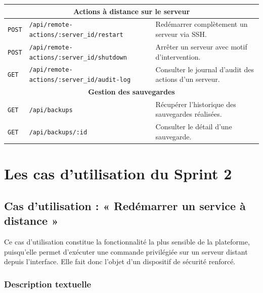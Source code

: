 \begin{longtable}{|p{1.6cm}|>{\raggedright\arraybackslash}p{7.4cm}|p{5.4cm}|}
\multicolumn{3}{|c|}{\textbf{Actions à distance sur le serveur}} \\
\hline
\texttt{POST} & \texttt{/api/remote-actions/}\allowbreak\texttt{:server\_id/}\allowbreak\texttt{restart} & Redémarrer complètement un serveur via SSH. \\
\hline
\texttt{POST} & \texttt{/api/remote-actions/}\allowbreak\texttt{:server\_id/}\allowbreak\texttt{shutdown} & Arrêter un serveur avec motif d'intervention. \\
\hline
\texttt{GET} & \texttt{/api/remote-actions/}\allowbreak\texttt{:server\_id/}\allowbreak\texttt{audit-log} & Consulter le journal d'audit des actions d'un serveur. \\
\hline

\multicolumn{3}{|c|}{\textbf{Gestion des sauvegardes}} \\
\hline
\texttt{GET} & \texttt{/api/backups} & Récupérer l'historique des sauvegardes réalisées. \\
\hline
\texttt{GET} & \texttt{/api/backups/:id} & Consulter le détail d'une sauvegarde. \\
\hline

\end{longtable}
\normalsize

\section{Les cas d'utilisation du Sprint 2}

\subsection{Cas d'utilisation : « Redémarrer un service à distance »}
Ce cas d'utilisation constitue la fonctionnalité la plus sensible de la plateforme,
puisqu'elle permet d'exécuter une commande privilégiée sur un serveur distant depuis
l'interface. Elle fait donc l'objet d'un dispositif de sécurité renforcé.

\subsubsection*{Description textuelle}

